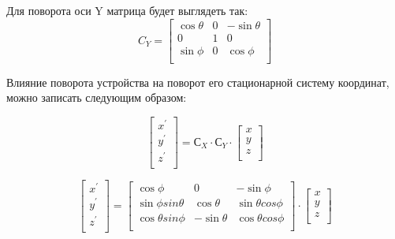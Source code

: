Для поворота оси Y матрица будет выглядеть так:\\

\begin{equation}
    \label{eq:domain:rotatYmat}
    C_Y = \begin{bmatrix} \cos{\theta} & 0 & -\sin{\theta} \\ 
        0 & 1 & 0 \\ 
        \sin{\phi} & 0 & \cos{\phi} \\ 
    \end{bmatrix}
    \end{equation} 

Влияние поворота устройства на поворот его стационарной систему координат,
можно записать следующим образом:

\begin{equation}
    \label{eq:domain:magnetTilt}
    \begin{bmatrix} x^{'} \\ y^{'} \\ z^{'} \\ \end{bmatrix} = 
            С_X \cdot С_Y \cdot \begin{bmatrix} x \\ y \\ z \\ \end{bmatrix}
    \end{equation} 

\begin{equation}
    \label{eq:domain:magnetTiltExtendet}
    \begin{bmatrix} x^{'} \\ y^{'} \\ z^{'} \\ \end{bmatrix} = 
    \begin{bmatrix} \cos{\phi} & 0 & -\sin{\phi} \\ 
        \sin{\phi}sin{\theta} & \cos{\theta} & \sin{\theta}cos{\phi} \\ 
        \cos{\theta}sin{\phi} & -\sin{\theta} & \cos{\theta}cos{\phi} \\ 
    \end{bmatrix}
    \cdot
    \begin{bmatrix} x \\ y \\ z \\ \end{bmatrix}
    \end{equation} 

